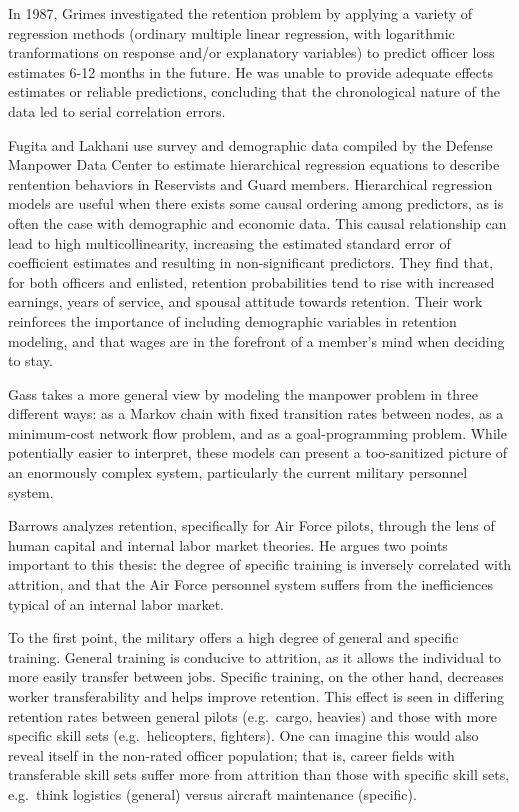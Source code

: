 \documentclass[12pt,letterpaper,toc=flat,oneside]{report}
\theoremstyle{definition}
\theoremstyle{definition}
\theoremstyle{definition}
\theoremstyle{remark}
\begin{document}
In 1987, Grimes \cite{grimes-1987} investigated the retention problem by
applying a variety of regression methods (ordinary multiple linear
regression, with logarithmic tranformations on response and/or
explanatory variables) to predict officer loss estimates 6-12 months in
the future. He was unable to provide adequate effects estimates or
reliable predictions, concluding that the chronological nature of the
data led to serial correlation errors.

Fugita and Lakhani \cite{fugita-lakhani-1991} use survey and demographic
data compiled by the Defense Manpower Data Center to estimate
hierarchical regression equations to describe rentention behaviors in
Reservists and Guard members. Hierarchical regression models are useful
when there exists some causal ordering among predictors, as is often the
case with demographic and economic data. This causal relationship can
lead to high multicollinearity, increasing the estimated standard error
of coefficient estimates and resulting in non-significant predictors.
They find that, for both officers and enlisted, retention probabilities
tend to rise with increased earnings, years of service, and spousal
attitude towards retention. Their work reinforces the importance of
including demographic variables in retention modeling, and that wages
are in the forefront of a member's mind when deciding to stay.

Gass \cite{gass-1991} takes a more general view by modeling the manpower
problem in three different ways: as a Markov chain with fixed transition
rates between nodes, as a minimum-cost network flow problem, and as a
goal-programming problem. While potentially easier to interpret, these
models can present a too-sanitized picture of an enormously complex
system, particularly the current military personnel system.

Barrows \cite{barrows-1993} analyzes retention, specifically for Air
Force pilots, through the lens of human capital and internal labor
market theories. He argues two points important to this thesis: the
degree of specific training is inversely correlated with attrition, and
that the Air Force personnel system suffers from the inefficiences
typical of an internal labor market.

To the first point, the military offers a high degree of general and
specific training. General training is conducive to attrition, as it
allows the individual to more easily transfer between jobs. Specific
training, on the other hand, decreases worker transferability and helps
improve retention. This effect is seen in differing retention rates
between general pilots (e.g.~cargo, heavies) and those with more
specific skill sets (e.g.~helicopters, fighters). One can imagine this
would also reveal itself in the non-rated officer population; that is,
career fields with transferable skill sets suffer more from attrition
than those with specific skill sets, e.g.~think logistics (general)
versus aircraft maintenance (specific).
\end{document}
